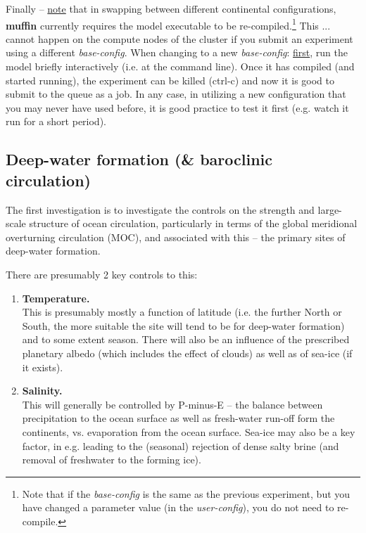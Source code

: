 \documentclass[11pt,fleqn]{book} %
\begin{document}
Finally -- \uline{note} that in swapping between different continental configurations, \textbf{muffin} currently requires the model executable to be  re-compiled.\footnote{Note that if the \textit{base-config} is the same as the previous experiment, but you have changed a parameter value (in the \textit{user-config}), you do not need to re-compile.} This ... cannot happen on the compute nodes of the cluster if you submit an experiment using a different \textit{base-config}. When changing to a new \textit{base-config}: \uline{first}, run the model briefly interactively (i.e. at the command line). Once it has compiled (and started running), the experiment can be killed (\textsf{ctrl-c}) and now it is good to submit to the queue as a job. In any case, in utilizing a new configuration that you may never have used before, it is good practice to test it first (e.g. watch it run for a short period).


\subsection{Deep-water formation (\& baroclinic circulation)}

The first investigation is to investigate the controls on the strength and large-scale structure of ocean circulation, particularly in terms of the global meridional overturning circulation (MOC), and associated with this -- the primary sites of deep-water formation.

There are presumably 2 key controls to this:

\vspace{2mm}
\begin{enumerate}
\item \textbf{Temperature.}
\\This is presumably mostly a function of latitude (i.e. the further North or South, the more suitable the site will tend to be for deep-water formation) and to some extent season. There will also be an influence of the prescribed planetary albedo (which includes the effect of clouds) as well as of sea-ice (if it exists).
\vspace{2mm}
\item \textbf{Salinity.}
\\This will generally be controlled by P-minus-E -- the balance between precipitation to the ocean surface as well as fresh-water run-off form the continents, vs. evaporation from the ocean surface. Sea-ice may also be a key factor, in e.g. leading to the (seasonal) rejection of dense salty brine (and removal of freshwater to the forming ice).
\end{enumerate}
\vspace{2mm}
\end{document}
